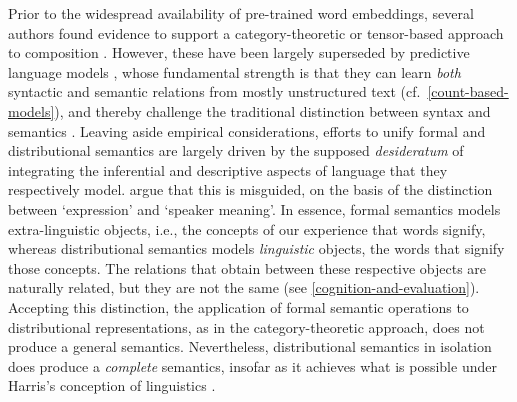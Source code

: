 Prior to the widespread availability of pre-trained word embeddings, several authors
found evidence to support a category-theoretic or tensor-based approach to composition
\parencites[e.g.][]{Baroni2010}{Dinu2010}{Grefenstette2011}.
However, these have been largely superseded by predictive language models
\parencites{Milajevs2014}, whose fundamental strength is that they can learn
\emph{both} syntactic and semantic relations from mostly unstructured text
(cf.~\cref{count-based-models}), and thereby challenge the traditional distinction
between syntax and semantics \parencites[186-191]{Gastaldi2021}.
Leaving aside empirical considerations, efforts to unify formal and distributional
semantics are largely driven by the supposed \emph{desideratum} of integrating the
inferential and descriptive aspects of language that they respectively model.
\textcites{Westera2019} argue that this is misguided, on the basis of the distinction
between `expression' and `speaker meaning'.
In essence, formal semantics models extra-linguistic objects, i.e., the concepts of our
experience that words signify, whereas distributional semantics models
\emph{linguistic} objects, the words that signify those concepts.
The relations that obtain between these respective objects are naturally related, but
they are not the same (see \cref{cognition-and-evaluation}).
Accepting this distinction, the application of formal semantic operations to
distributional representations, as in the category-theoretic approach, does not produce
a general semantics.
Nevertheless, distributional semantics in isolation does produce a \emph{complete}
semantics, insofar as it achieves what is possible under Harris's conception of
linguistics .
